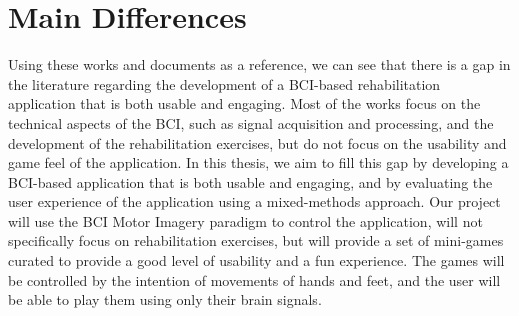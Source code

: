 \section{Main Differences}
Using these works and documents as a reference, we can see that there is a gap in the literature regarding the development of a BCI-based rehabilitation application that is both usable and engaging.
Most of the works focus on the technical aspects of the BCI, such as signal acquisition and processing, and the development of the rehabilitation exercises, but do not focus on the usability and game feel of the application.
In this thesis, we aim to fill this gap by developing a BCI-based application that is both usable and engaging, and by evaluating the user experience of the application using a mixed-methods approach.
Our project will use the BCI Motor Imagery paradigm to control the application, will not specifically focus on rehabilitation exercises, but will provide a set of mini-games curated to provide a good level of usability and a fun experience.
The games will be controlled by the intention of movements of hands and feet, and the user will be able to play them using only their brain signals.
